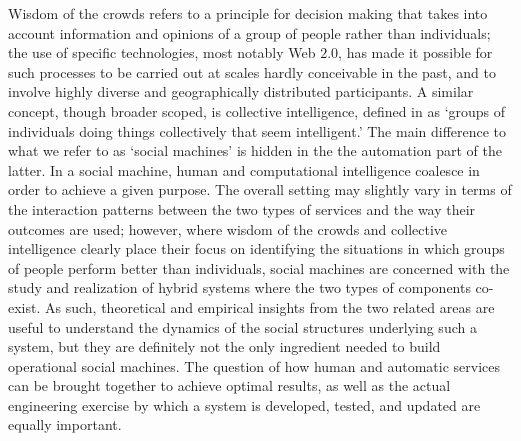 \documentclass{sig-alternate}
\begin{document}
Wisdom of the crowds \cite{surowiecki2005wisdom} refers to a principle for decision making that takes into account information and opinions of a group of people rather than individuals; the use of specific technologies, most notably Web $2.0$, has made it possible for such processes to be carried out at scales hardly conceivable in the past, and to involve highly diverse and geographically distributed participants. A similar concept, though broader scoped, is collective intelligence, defined in \cite{malone2009harnessing} as `groups of individuals doing things collectively that seem intelligent.' The main difference to what we refer to as `social machines' is hidden in the the automation part of the latter. In a social machine, human and computational intelligence coalesce in order to achieve a given purpose. The overall setting may slightly vary in terms of the interaction patterns between the two types of services and the way their outcomes are used; however, where wisdom of the crowds and collective intelligence clearly place their focus on identifying the situations in which groups of people perform better than individuals, social machines are concerned with the study and realization of hybrid systems where the two types of components co-exist. As such, theoretical and empirical insights from the two related areas are useful to understand the dynamics of the social structures underlying such a system, but they are definitely not the only ingredient needed to build operational social machines. The question of how human and automatic services can be brought together to achieve optimal results, as well as the actual engineering exercise by which a system is developed, tested, and updated are equally important.
\end{document}
